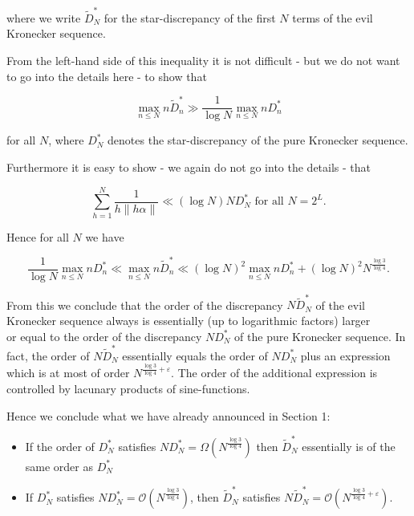 \documentclass[10pt]{article}
\newcommand{\1}{\mathbf{1}}
\begin{document}
where we write $\widetilde{D}_{N}^{*}$ for the star-discrepancy of the first $N$ terms of the evil Kronecker sequence.

From the left-hand side of this inequality it is not difficult - but we do not want to go into the details here - to show that

$$
\max _{n \leqslant N} n \widetilde{D}_{n}^{*} \gg \frac{1}{\log N} \max _{n \leqslant N} n D_{n}^{*}
$$

for all $N$, where $D_{N}^{*}$ denotes the star-discrepancy of the pure Kronecker sequence.

Furthermore it is easy to show - we again do not go into the details - that

$$
\sum_{h=1}^{N} \frac{1}{h\|h \alpha\|} \ll(\log N) N D_{N}^{*} \text { for all } N=2^{L} .
$$

Hence for all $N$ we have


\begin{equation*}
\frac{1}{\log N} \max _{n \leqslant N} n D_{n}^{*} \ll \max _{n \leqslant N} n \widetilde{D}_{n}^{*} \ll(\log N)^{2} \max _{n \leqslant N} n D_{n}^{*}+(\log N)^{2} N^{\frac{\log 3}{\log 4}} . \tag{6.2}
\end{equation*}


From this we conclude that the order of the discrepancy $N \widetilde{D}_{N}^{*}$ of the evil Kronecker sequence always is essentially (up to logarithmic factors) larger\\
or equal to the order of the discrepancy $N D_{N}^{*}$ of the pure Kronecker sequence. In fact, the order of $N \widetilde{D}_{N}^{*}$ essentially equals the order of $N D_{N}^{*}$ plus an expression which is at most of order $N^{\frac{\log 3}{\log 4}+\varepsilon}$. The order of the additional expression is controlled by lacunary products of sine-functions.

Hence we conclude what we have already announced in Section 1:

\begin{itemize}
  \item[-] If the order of $D_{N}^{*}$ satisfies $N D_{N}^{*}=\Omega\left(N^{\frac{\log 3}{\log 4}}\right)$ then $\widetilde{D}_{N}^{*}$ essentially is of the same order as $D_{N}^{*}$
  \item[-] If $D_N^*$ satisfies $ND_N^*=\mathcal{O}\left(N^{\frac{\log3}{\log4}}\right)$, then $\widetilde D_N^*$ satisfies $N\widetilde D_N^*=\mathcal{O}\left(N^{\frac{\log3}{\log4}+\varepsilon}\right)$.
\end{itemize}
\end{document}
